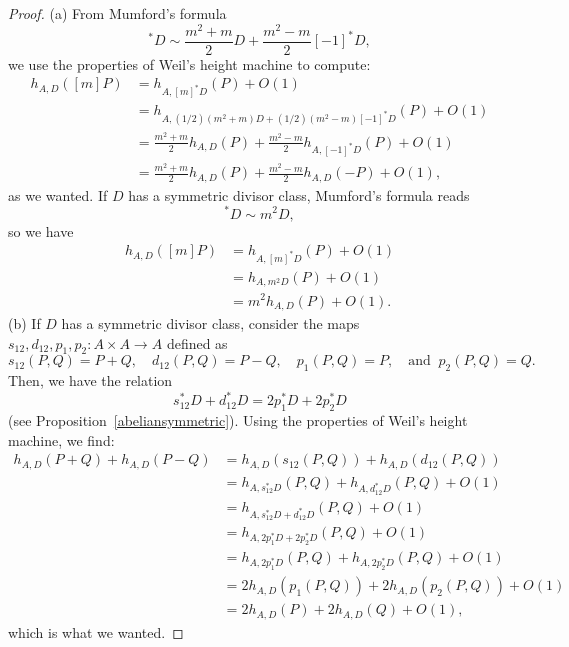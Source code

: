 \documentclass[a4paper, 12pt]{amsart}
\theoremstyle{definition}
\theoremstyle{plain}
\theoremstyle{plain}
\theoremstyle{plain}
\theoremstyle{plain}
\theoremstyle{remark}
\theoremstyle{remark}
\theoremstyle{plain}
\newcommand{\propref}[1]{Proposition~\ref{#1}}
\begin{document}
	\begin{proof}
		(a) From Mumford's formula
		\begin{equation*}
			[m]^*D\sim\frac{m^2+m}{2}D+\frac{m^2-m}{2}[-1]^*D,
		\end{equation*}
		we use the properties of Weil's height machine to compute:
		\begin{align*}
			h_{A,D}([m]P)&=h_{A,[m]^*D}(P)+O(1)\\
			&=h_{A,(1/2)(m^2+m)D+(1/2)(m^2-m)[-1]^*D}(P)+O(1)\\
			&=\frac{m^2+m}{2}h_{A,D}(P)+\frac{m^2-m}{2}h_{A,[-1]^*D}(P)+O(1)\\
			&=\frac{m^2+m}{2}h_{A,D}(P)+\frac{m^2-m}{2}h_{A,D}(-P)+O(1),
		\end{align*}
		as we wanted. If $D$ has a symmetric divisor class, Mumford's formula reads
		\begin{equation*}
			[m]^*D\sim m^2D,
		\end{equation*}
		so we have 
		\begin{align*}
			h_{A,D}([m]P)&=h_{A,[m]^*D}(P)+O(1)\\
			&=h_{A,m^2D}(P)+O(1)\\
			&=m^2h_{A,D}(P)+O(1).
		\end{align*}
		(b) If $D$ has a symmetric divisor class, consider the maps $s_{12},d_{12},p_1,p_2:A\times A\rightarrow A$ defined as
		\begin{equation*}
			s_{12}(P,Q)=P+Q,\quad d_{12}(P,Q)=P-Q,\quad p_1(P,Q)=P,\quad\text{and }\ p_2(P,Q)=Q.
		\end{equation*}
		Then, we have the relation
		\begin{equation*}
			s_{12}^*D+d_{12}^*D=2p_1^*D+2p_2^*D
		\end{equation*}
		(see \propref{abeliansymmetric}). Using the properties of Weil's height machine, we find:
		\begin{align*}
			h_{A,D}(P+Q)+h_{A,D}(P-Q)&=h_{A,D}(s_{12}(P,Q))+h_{A,D}(d_{12}(P,Q))\\
			&=h_{A,s_{12}^*D}(P,Q)+h_{A,d_{12}^*D}(P,Q)+O(1)\\
			&=h_{A,s_{12}^*D+d_{12}^*D}(P,Q)+O(1)\\
			&=h_{A,2p_1^*D+2p_2^*D}(P,Q)+O(1)\\
			&=h_{A,2p_1^*D}(P,Q)+h_{A,2p_2^*D}(P,Q)+O(1)\\
			&=2h_{A,D}(p_1(P,Q))+2h_{A,D}(p_2(P,Q))+O(1)\\
			&=2h_{A,D}(P)+2h_{A,D}(Q)+O(1),
		\end{align*}
		which is what we wanted.
	\end{proof}
	
\end{document}
